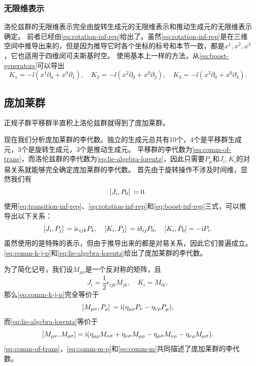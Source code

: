\subsubsection{无限维表示}

洛伦兹群的无限维表示完全由旋转生成元的无限维表示和推动生成元的无限维表示确定。
前者已经由\eqref{eq:rotation-inf-rep}给出了。虽然\eqref{eq:rotation-inf-rep}是在三维空间中推导出来的，但是因为推导它时各个坐标的标号和本节一致，都是$x^1, x^2, x^3$，它也适用于四维闵可夫斯基时空。
使用基本上一样的方法，从\eqref{eq:boost-generators}可以导出
\begin{equation}
    K_1 = - \ii (x^1 \partial_0 + x^0 \partial_1), \quad K_2 = - \ii (x^2 \partial_0 + x^0 \partial_2), \quad K_3 = - \ii (x^3 \partial_0 + x^0 \partial_3).
    \label{eq:boost-inf-rep}
\end{equation}

\subsection{庞加莱群}

正规子群平移群半直积上洛伦兹群就得到了庞加莱群。

现在我们分析庞加莱群的李代数。独立的生成元总共有10个，4个是平移群生成元，3个是旋转生成元，3个是推动生成元。
平移群的李代数为\eqref{eq:comm-of-trans}，而洛伦兹群的李代数为\eqref{eq:lie-algebra-lorentz}，因此只需要$P_\mu$和$J_i,K_i$的对易关系就能够完全确定庞加莱群的李代数。
首先由于旋转操作不涉及时间维，显然我们有
\begin{equation}
    \comm*{J_i}{P_0} = 0.
\end{equation}
使用\eqref{eq:transition-inf-rep}、\eqref{eq:rotation-inf-rep}和\eqref{eq:boost-inf-rep}三式，可以推导出以下关系：
\begin{equation}
    \comm*{J_i}{P_j} = \ii \epsilon_{ijk} P_k, \quad \comm*{K_i}{P_j} = \ii \delta_{ij} P_0, \quad \comm{K_i}{P_0} = - \ii P_i.
    \label{eq:comm-k-j-p}
\end{equation}
虽然使用的是特殊的表示，但由于推导出来的都是对易关系，因此它们普遍成立。
\eqref{eq:comm-k-j-p}和\eqref{eq:lie-algebra-lorentz}给出了庞加莱群的李代数。

为了简化记号，我们设$M_{\mu \nu}$是一个反对称的矩阵，且
\begin{equation}
    J_i = \frac{1}{2} \epsilon_{ijk} M_{jk}, \quad K_i = M_{0i},
\end{equation}
那么\eqref{eq:comm-k-j-p}完全等价于
\begin{equation}
    \comm*{M_{\mu \nu}}{P_\rho} = \ii (\eta_{\mu \rho} P_\nu - \eta_{\nu \rho} P_\mu),
    \label{eq:comm-m-p}
\end{equation}
而\eqref{eq:lie-algebra-lorentz}等价于
\begin{equation}
    \comm{M_{\mu \nu}}{M_{\rho \sigma}}  = \ii (\eta_{\mu \rho} M_{\nu \sigma} + \eta_{\nu \sigma} M_{\mu \rho} - \eta_{\mu \sigma} M_{\nu \rho} - \eta_{\nu \rho} M_{\mu \sigma}).
    \label{eq:comm-m}
\end{equation}
\eqref{eq:comm-of-trans}，\eqref{eq:comm-m-p}和\eqref{eq:comm-m}共同描述了庞加莱群的李代数。

